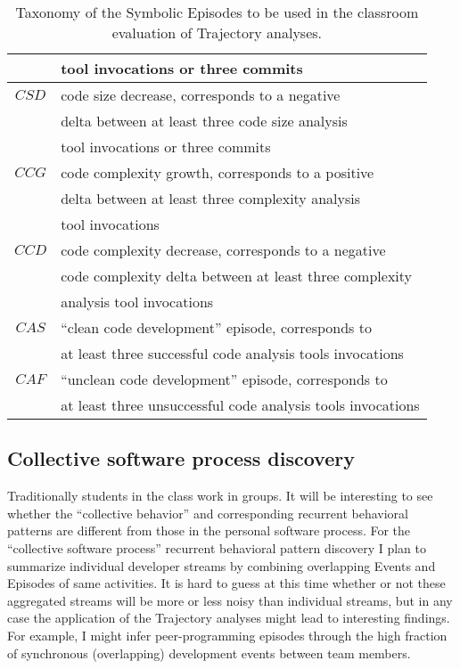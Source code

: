 \begin{table}
\begin{center}
\begin{tabular}{ | c | l | }
													& tool invocations or three commits \\
		\hline
		$CSD$ 								& code size decrease, corresponds to a negative \\
													& delta between at least three code size analysis \\
													& tool invocations or three commits \\																										
		\hline
		$CCG$ 								& code complexity growth, corresponds to a positive \\
													& delta between at least three complexity analysis \\
													& tool invocations \\
		\hline
		$CCD$ 								& code complexity decrease, corresponds to a negative \\
													& code complexity delta between at least three complexity \\
													& analysis tool invocations \\													
		\hline
		$CAS$ 								& ``clean code development'' episode, corresponds to \\
													& at least three successful code analysis tools invocations \\
		\hline
		$CAF$ 								& ``unclean code development'' episode, corresponds to \\
													& at least three unsuccessful code analysis tools invocations \\
		\hline		
	  \end{tabular}
    \caption{Taxonomy of the Symbolic Episodes to be used in the classroom evaluation of Trajectory analyses.}
    \label{fig:data_collected_intervals}
    \end{center}
\end{table}

\subsection{Collective software process discovery}
Traditionally students in the class work in groups. It will be interesting to see whether the ``collective behavior'' and corresponding recurrent behavioral patterns are different from those in the personal software process. For the ``collective software process'' recurrent behavioral pattern discovery I plan to summarize individual developer streams by combining overlapping Events and Episodes of same activities. It is hard to guess at this time whether or not these aggregated streams will be more or less noisy than individual streams, but in any case the application of the Trajectory analyses might lead to interesting findings. For example, I might infer peer-programming episodes through the high fraction of synchronous (overlapping) development events between team members.
